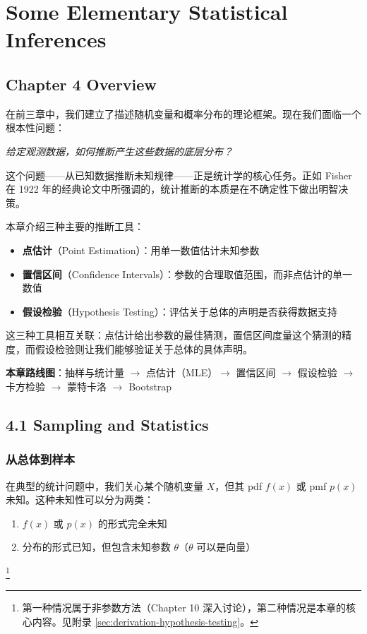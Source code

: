 \chapter{Some Elementary Statistical Inferences}\label{chap:elementary-statistical-inferences}

\section*{Chapter 4 Overview}

在前三章中，我们建立了描述随机变量和概率分布的理论框架。现在我们面临一个根本性问题：

\begin{center}
\textit{给定观测数据，如何推断产生这些数据的底层分布？}
\end{center}

这个问题——从已知数据推断未知规律——正是统计学的核心任务。正如 Fisher 在 1922 年的经典论文中所强调的，统计推断的本质是在不确定性下做出明智决策。

本章介绍三种主要的推断工具：
\begin{itemize}
\item \textbf{点估计}（Point Estimation）：用单一数值估计未知参数
\item \textbf{置信区间}（Confidence Intervals）：参数的合理取值范围，而非点估计的单一数值
\item \textbf{假设检验}（Hypothesis Testing）：评估关于总体的声明是否获得数据支持
\end{itemize}

这三种工具相互关联：点估计给出参数的最佳猜测，置信区间度量这个猜测的精度，而假设检验则让我们能够验证关于总体的具体声明。

\textbf{本章路线图}：抽样与统计量 $\to$ 点估计（MLE）$\to$ 置信区间 $\to$ 假设检验 $\to$ 卡方检验 $\to$ 蒙特卡洛 $\to$ Bootstrap

\section{4.1 Sampling and Statistics}\label{sec:4.1}

\subsection{从总体到样本}

在典型的统计问题中，我们关心某个随机变量 $X$，但其 pdf $f(x)$ 或 pmf $p(x)$ 未知。这种未知性可以分为两类：

\begin{enumerate}
\item $f(x)$ 或 $p(x)$ 的形式完全未知
\item 分布的形式已知，但包含未知参数 $\theta$（$\theta$ 可以是向量）
\end{enumerate}\footnote{第一种情况属于非参数方法（Chapter 10 深入讨论），第二种情况是本章的核心内容。见附录 \cref{sec:derivation-hypothesis-testing}。}

